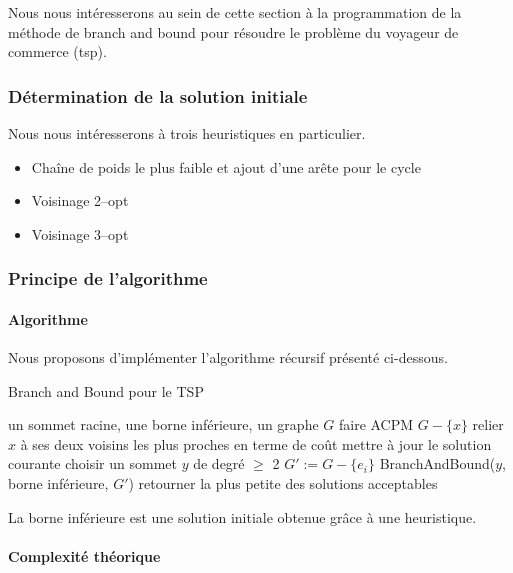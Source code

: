 Nous nous intéresserons au sein de cette section à la programmation de
la méthode de branch and bound pour résoudre le problème du voyageur
de commerce (tsp).

\subsubsection{Détermination de la solution initiale}

 Nous nous intéresserons à trois heuristiques en particulier.
\begin{itemize}
\item Chaîne de poids le plus faible et ajout d'une arête pour le
  cycle
\item Voisinage 2--opt
\item Voisinage 3--opt
\end{itemize}

\subsubsection{Principe de l'algorithme}

\paragraph{Algorithme}

Nous proposons d'implémenter l'algorithme récursif présenté ci-dessous.

\begin{algorithm}[!ht]
\caption{Branch and Bound pour le TSP}
\label{BBtsp}
\begin{algorithmic}[1]
\REQUIRE un sommet racine, une borne inférieure, un graphe $G$
\STATE faire ACPM $G - \{x \}$
\STATE relier $x$ à ses deux voisins les plus proches en terme de coût
\STATE mettre à jour le solution courante
\ELSE
\STATE choisir un sommet $y$ de degré $\geq$ 2
\STATE $G' := G - \{ e_i \}$
\STATE BranchAndBound($y$, borne inférieure, $G'$)
\ENDFOR
\ENDIF
\ENDIF
\STATE retourner la plus petite des solutions acceptables
\end{algorithmic}
\end{algorithm}

La borne inférieure est une solution initiale obtenue grâce à une heuristique.

\paragraph{Complexité théorique}

